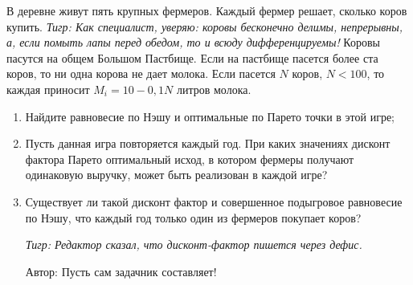 \begin{problem}[Коровы]
В деревне живут пять крупных фермеров. Каждый фермер решает, сколько коров купить. {\it Тигр: Как специалист, уверяю: коровы  бесконечно делимы, непрерывны, а, если помыть лапы перед обедом, то и  всюду дифференцируемы!} Коровы пасутся на общем Большом Пастбище. Если на пастбище пасется более ста коров, то ни одна корова не дает молока. Если пасется  $N$  коров,  $N<100$, то каждая приносит  $M_{i} =10-0,1N$  литров молока.\par
\begin{enumerate}
\item Найдите равновесие по Нэшу и оптимальные по Парето точки в этой игре;\par
\item Пусть данная игра повторяется каждый год. При каких значениях дисконт фактора Парето оптимальный исход, в котором фермеры получают одинаковую выручку, может быть реализован в каждой игре?\par
\item  Существует ли такой дисконт фактор и совершенное подыгровое равновесие по Нэшу, что каждый год только один из фермеров покупает коров?\par
{\it Тигр: Редактор сказал, что дисконт-фактор пишется через дефис.}\par
Автор: Пусть сам задачник составляет!
\end{enumerate}


\begin{sol}

\end{sol}
\end{problem}



